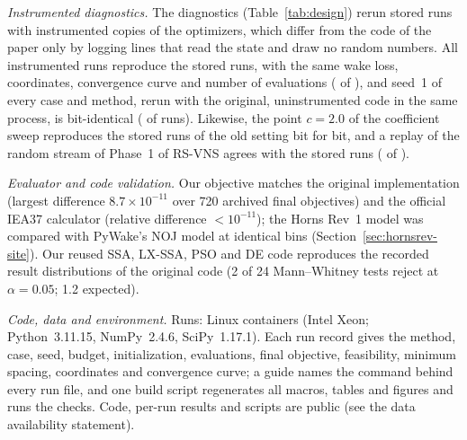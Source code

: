 \emph{Instrumented diagnostics.} The diagnostics (Table~\ref{tab:design}) rerun stored runs with instrumented copies of the optimizers, which differ from the code of the paper only by logging lines that read the state and draw no random numbers. All instrumented runs reproduce the stored runs, with the same wake loss, coordinates, convergence curve and number of evaluations (\NDVerStoredMatch{} of \NDVerRuns), and seed~1 of every case and method, rerun with the original, uninstrumented code in the same process, is bit-identical (\NDVerBitMatch{} of \NDVerBitRuns{} runs). Likewise, the point $c=2.0$ of the coefficient sweep reproduces the stored runs of the old setting bit for bit, and a replay of the random stream of Phase~1 of RS-VNS agrees with the stored runs (\NDRsReplayAgree{} of \NDRsReplayChecked).

\emph{Evaluator and code validation.} Our objective matches the original implementation (largest difference $8.7\times10^{-11}$ over 720 archived final objectives) and the official IEA37 calculator (relative difference ${<}10^{-11}$); the Horns Rev~1 model was compared with PyWake's NOJ model at identical bins (Section~\ref{sec:hornsrev-site}). Our reused SSA, LX-SSA, PSO and DE code reproduces the recorded result distributions of the original code (2 of 24 Mann--Whitney tests reject at $\alpha=0.05$; 1.2 expected).

\emph{Code, data and environment.} Runs: Linux containers (Intel Xeon; Python~3.11.15, NumPy~2.4.6, SciPy~1.17.1). Each run record gives the method, case, seed, budget, initialization, evaluations, final objective, feasibility, minimum spacing, coordinates and convergence curve; a guide names the command behind every run file, and one build script regenerates all macros, tables and figures and runs the checks. Code, per-run results and scripts are public (see the data availability statement).
